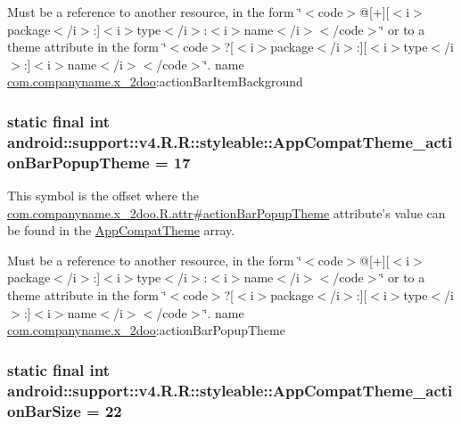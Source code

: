 Must be a reference to another resource, in the form \char`\"{}$<$code$>$@\mbox{[}+\mbox{]}\mbox{[}$<$i$>$package$<$/i$>$:\mbox{]}$<$i$>$type$<$/i$>$:$<$i$>$name$<$/i$>$$<$/code$>$\char`\"{} or to a theme attribute in the form \char`\"{}$<$code$>$?\mbox{[}$<$i$>$package$<$/i$>$:\mbox{]}\mbox{[}$<$i$>$type$<$/i$>$:\mbox{]}$<$i$>$name$<$/i$>$$<$/code$>$\char`\"{}.  name \hyperlink{namespacecom_1_1companyname_1_1x__2doo}{com.companyname.x\_\-2doo}:actionBarItemBackground \hypertarget{classandroid_1_1support_1_1v4_1_1_r_1_1styleable_b8e3e3d79004f9d863d1f02f888e17e8}{
\subsubsection[{AppCompatTheme\_\-actionBarPopupTheme}]{\setlength{\rightskip}{0pt plus 5cm}static final int android::support::v4.R.R::styleable::AppCompatTheme\_\-actionBarPopupTheme = 17}}
\label{classandroid_1_1support_1_1v4_1_1_r_1_1styleable_b8e3e3d79004f9d863d1f02f888e17e8}


This symbol is the offset where the \hyperlink{classcom_1_1companyname_1_1x__2doo_1_1_r_1_1attr_d8d08b71d46e591ceb2cf37aff400388}{com.companyname.x\_\-2doo.R.attr\#actionBarPopupTheme} attribute's value can be found in the \hyperlink{classandroid_1_1support_1_1v4_1_1_r_1_1styleable_0873e92ba21076bb5a4aeadeb7f5779f}{AppCompatTheme} array.

Must be a reference to another resource, in the form \char`\"{}$<$code$>$@\mbox{[}+\mbox{]}\mbox{[}$<$i$>$package$<$/i$>$:\mbox{]}$<$i$>$type$<$/i$>$:$<$i$>$name$<$/i$>$$<$/code$>$\char`\"{} or to a theme attribute in the form \char`\"{}$<$code$>$?\mbox{[}$<$i$>$package$<$/i$>$:\mbox{]}\mbox{[}$<$i$>$type$<$/i$>$:\mbox{]}$<$i$>$name$<$/i$>$$<$/code$>$\char`\"{}.  name \hyperlink{namespacecom_1_1companyname_1_1x__2doo}{com.companyname.x\_\-2doo}:actionBarPopupTheme \hypertarget{classandroid_1_1support_1_1v4_1_1_r_1_1styleable_ee6703791177fb18457f6fa90659aad3}{
\subsubsection[{AppCompatTheme\_\-actionBarSize}]{\setlength{\rightskip}{0pt plus 5cm}static final int android::support::v4.R.R::styleable::AppCompatTheme\_\-actionBarSize = 22}}
\label{classandroid_1_1support_1_1v4_1_1_r_1_1styleable_ee6703791177fb18457f6fa90659aad3}


